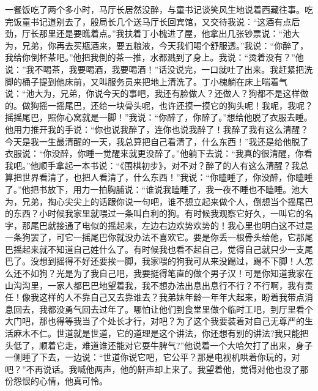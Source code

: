 \documentclass[12pt,oneside]{book}
\begin{document}
一餐饭吃了两个多小时，马厅长居然没醉，与童书记谈笑风生地说着西藏往事。吃完饭童书记道别去了，殷局长几个送马厅长回宾馆，又交待我说：``这酒有点后劲，厅长那里还是要瞧着点。''我扶着丁小槐进了屋，他拿出几张钞票说：``池大为，兄弟，你再去买瓶酒来，要五粮液，今天我们喝个舒服透。''我说：``你醉了，我给你倒杯茶吧。''他把我倒的茶一推，水都溅到了身上。我说：``烫着没有？''他说：''我不喝茶，我要喝酒，我要喝酒！''话没说完，一口就吐了出来。我赶紧把洗脚的桶子提到他床前，又叫服务员来把地上清洗了。丁小槐躺在床上喘着气说：``池大为，兄弟，你说今天的事吧，我还有脸做人？还做人？狗都不是这样做的。做狗摇一摇尾巴，还给一块骨头呢，也许还摸一摸它的狗头呢！我呢，我呢？摇摇尾巴，照你心窝就是一脚！''我说：``你醉了，你醉了。''想给他脱了衣服去睡。他用力推开我的手说：``你也说我醉了，连你也说我醉了！我醉了我有这么清醒？今天是我一生最清醒的一天，我总算把自己看清了，什么东西！''我还是给他脱了衣服说：``你没醉，你睡一觉醒来就更没醉了。''他躺下去说：``我真的很清醒，你看我吧。''他顺手拿起一本书说：``《围棋初步》，对不对？醉了的人有这么清醒？我总算把世界看清了，也把人看清了，什么东西！''我说：``你瞌睡了，你没醉，你瞌睡了。''他把书放下，用力一拍胸脯说：``谁说我瞌睡了，我一夜不睡也不瞌睡。池大为，兄弟，掏心尖尖上的话跟你说一句吧，谁不想立起来做个人，倒想当个摇尾巴的东西？小时候我家里就喂过一条叫白利的狗。有时候我观察它好久，一叫它的名字，那尾巴就接通了电似的摇起来，左边右边欢势欢势的！我心里也明白这不过是一条狗罢了，可它一摇尾巴你就没办法不喜欢它。要是你丢一根骨头给他，它那尾巴摇起来就不知道自己姓什么了。有时候我也看不起自己，觉得自己就只少一支尾巴了。没想到摇得不好还要挨一脚，我家喂的狗我可从来没踢过，踢不下脚！人怎么还不如狗？光是为了我自己吧，我要挺得笔直的做个男子汉！可是你知道我家在山沟沟里，一家人都巴巴地望着我，我不想办法出息出息行不行？不行啊，我有责任！像我这样的人不靠自己又去靠谁去？我弟妹年龄一年年大起来，盼着我带点消息回去，我都没勇气回去过年了。哪怕让他们到食堂里做个临时工吧，到厅里看个大门吧，那也得等我当了个处长才行，对吧？为了这个我要装着对自己无尊严的生活麻木不仁。世道就是世道，它的道理是这个讲法，你还想有别的讲法?我只能把头低了，顺着它走，难道谁还能对它耍牛脾气?''他说着一个大哈欠打了出来，身子一侧睡了下去，一边说：``世道你说它吧，它公平？那是电视机哄着你玩的，对吧？''不再说话。我喊他两声，他的鼾声却上来了。我望着他，觉得对他也没了那份怨恨的心情，他真可怜。
\end{document}

